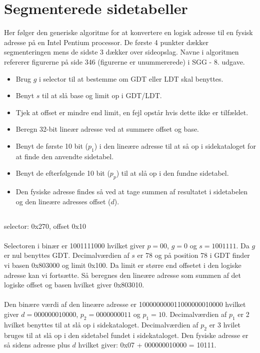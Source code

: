 \documentclass[titlepage]{article}
\begin{document}
\section{Segmenterede sidetabeller}
  Her følger den generiske algoritme for at konvertere en logisk adresse til en fysisk adresse på en Intel Pentium processor.
  De første 4 punkter dækker segmenteringen mens de sidste 3 dækker over sideopslag.
  Navne i algoritmen refererer figurerne på side 346 (figurerne er unummererede) i SGG - 8. udgave.
  \begin{itemize}
    \item Brug $g$ i selector til at bestemme om GDT eller LDT skal benyttes.
    \item Benyt $s$ til at slå base og limit op i GDT/LDT.
    \item Tjek at offset er mindre end limit, en fejl opstår hvis dette ikke er tilfældet.
    \item Beregn 32-bit lineær adresse ved at summere offset og base.
    \item Benyt de første 10 bit ($p_1$) i den lineære adresse til at så op i sidekataloget for at finde den anvendte sidetabel.
    \item Benyt de efterfølgende 10 bit ($p_p$) til at slå op i den fundne sidetabel.
    \item Den fysiske adresse findes så ved at tage summen af resultatet i sidetabelen og den lineære adresses offset ($d$).
  \end{itemize}
  
  \subsection{}
    selector: 0x270, offset 0x10
    \\\\
    Selectoren i binær er 1001111000 hvilket giver $p = 00$, $g = 0$ og $s = 1001111$.
    Da $g$ er nul benyttes GDT.
    Decimalværdien af $s$ er 78 og på position 78 i GDT finder vi basen 0x803000 og limit 0x100.
    Da limit er større end offsetet i den logiske adresse kan vi fortsætte.
    Så beregnes den lineære adresse som summen af det logiske offset og basen hvilket giver 0x803010.
    \\\\
    Den binære værdi af den lineære adresse er 100000000011000000010000 hvilket giver $d = 000000010000$, $p_2 = 0000000011$ og $p_1 = 10$.
    Decimalværdien af $p_1$ er 2 hvilket benyttes til at slå op i sidekataloget.
    Decimalværdien af $p_2$ er 3 hvilet bruges til at slå op i den sidetabel fundet i sidekataloget.
    Den fysiske adresse er så sidens adresse plus $d$ hvilket giver: 0x07 + 000000010000 = 10111.
    
\end{document}
